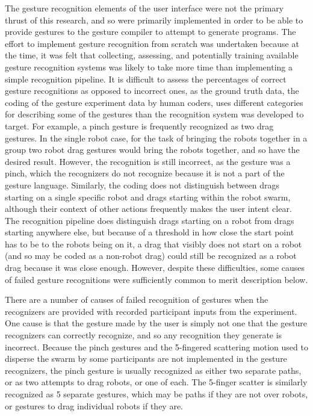The gesture recognition elements of the user interface were not the primary thrust of this research, and so were primarily implemented in order to be able to provide gestures to the gesture compiler to attempt to generate programs. 
The effort to implement gesture recognition from scratch was undertaken because at the time, it was felt that collecting, assessing, and potentially training available gesture recognition systems was likely to take more time than implementing a simple recognition pipeline. 
It is difficult to assess the percentages of correct gesture recognitions as opposed to incorrect ones, as the ground truth data, the coding of the gesture experiment data by human coders, uses different categories for describing some of the gestures than the recognition system was developed to target. 
For example, a pinch gesture is frequently recognized as two drag gestures. 
In the single robot case, for the task of bringing the robots together in a group two robot drag gestures would bring the robots together, and so have the desired result. 
However, the recognition is still incorrect, as the gesture was a pinch, which the recognizers do not recognize because it is not a part of the gesture language. 
Similarly, the coding does not distinguish between drags starting on a single specific robot and drags starting within the robot swarm, although their context of other actions frequently makes the user intent clear. 
The recognition pipeline does distinguish drags starting on a robot from drags starting anywhere else, but because of a threshold in how close the start point has to be to the robots being on it, a drag that visibly does not start on a robot (and so may be coded as a non-robot drag) could still be recognized as a robot drag because it was close enough. 
However, despite these difficulties, some causes of failed gesture recognitions were sufficiently common to merit description below. 

There are a number of causes of failed recognition of gestures when the recognizers are provided with recorded participant inputs from the experiment. 
One cause is that the gesture made by the user is simply not one that the gesture recognizers can correctly recognize, and so any recognition they generate is incorrect. 
Because the pinch gestures and the 5-fingered scattering motion used to disperse the swarm by some participants are not implemented in the gesture recognizers, the pinch gesture is usually recognized as either two separate paths, or as two attempts to drag robots, or one of each. 
The 5-finger scatter is similarly recognized as 5 separate gestures, which may be paths if they are not over robots, or gestures to drag individual robots if they are. 

